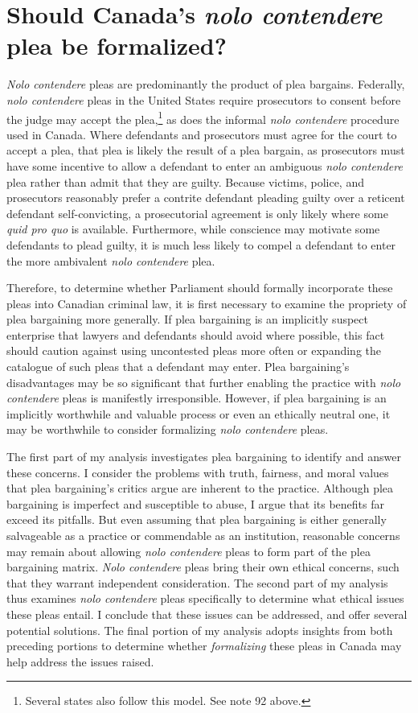 \chapter{Should Canada's \textit{nolo contendere} plea be formalized?}

\setcounter{footnote}{161}

\textit{Nolo contendere} pleas are predominantly the product of plea bargains. Federally, \textit{nolo contendere} pleas in the United States require prosecutors to consent before the judge may accept the plea,\footnote{Several states also follow this model. See note 92 above.} as does the informal \textit{nolo contendere} procedure used in Canada. Where defendants and prosecutors must agree for the court to accept a plea, that plea is likely the result of a plea bargain, as prosecutors must have some incentive to allow a defendant to enter an ambiguous \textit{nolo contendere} plea rather than admit that they are guilty. Because victims, police, and prosecutors reasonably prefer a contrite defendant pleading guilty over a reticent defendant self-convicting, a prosecutorial agreement is only likely where some \textit{quid pro quo} is available. Furthermore, while conscience may motivate some defendants to plead guilty, it is much less likely to compel a defendant to enter the more ambivalent \textit{nolo contendere} plea.

Therefore, to determine whether Parliament should formally incorporate these pleas into Canadian criminal law, it is first necessary to examine the propriety of plea bargaining more generally. If plea bargaining is an implicitly suspect enterprise that lawyers and defendants should avoid where possible, this fact should caution against using uncontested pleas more often or expanding the catalogue of such pleas that a defendant may enter. Plea bargaining's disadvantages may be so significant that further enabling the practice with \textit{nolo contendere} pleas is manifestly irresponsible. However, if plea bargaining is an implicitly worthwhile and valuable process or even an ethically neutral one, it may be worthwhile to consider formalizing \textit{nolo contendere} pleas.

The first part of my analysis investigates plea bargaining to identify and answer these concerns. I consider the problems with truth, fairness, and moral values that plea bargaining's critics argue are inherent to the practice. Although plea bargaining is imperfect and susceptible to abuse, I argue that its benefits far exceed its pitfalls. But even assuming that plea bargaining is either generally salvageable as a practice or commendable as an institution, reasonable concerns may remain about allowing \textit{nolo contendere} pleas to form part of the plea bargaining matrix. \textit{Nolo contendere} pleas bring their own ethical concerns, such that they warrant independent consideration. The second part of my analysis thus examines \textit{nolo contendere} pleas specifically to determine what ethical issues these pleas entail. I conclude that these issues can be addressed, and offer several potential solutions. The final portion of my analysis adopts insights from both preceding portions to determine whether \textit{formalizing} these pleas in Canada may help address the issues raised.